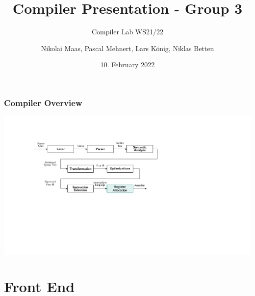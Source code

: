 \documentclass[navbaroff,en]{sdqbeamer}
\title{Compiler Presentation - Group 3}
\subtitle{Compiler Lab WS21/22}
\author[Nikolai, Pascal, Lars, Niklas]{Nikolai Maas, Pascal Mehnert, Lars König, Niklas Betten}
\date[10.\,2.\,2022]{10. February 2022}
\begin{document}
\KITtitleframe

\begin{frame}
	\frametitle{Compiler Overview}

	\centering \includegraphics[scale=0.5]{images/phases.ipe.pdf}

\end{frame}


\section{Front End}
\end{document}

